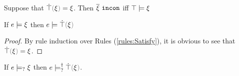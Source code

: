 \begin{lemma}
  \label{lem:inconsistency-and-entailment}
  Suppose that $\ctruify{\xi} = \xi$. Then $\overline{\xi} ~\mathtt{incon}$ iff $\top \models \xi$
\end{lemma}

\begin{lemma}
  \label{lem:satisfy-truify}
  If $e \models \xi$ then $\csatisfy{e}{\ctruify{\xi}}$
\end{lemma}
\begin{proof}
  By rule induction over Rules (\ref{rules:Satisfy}), it is obvious to see that $\ctruify{\xi} = \xi$.
\end{proof}

\begin{lemma}
  \label{lem:maysat-satormay-truify}
  If $e \models_{?} \xi$ then $\csatisfyormay{e}{\ctruify{\xi}}$.
\end{lemma}
